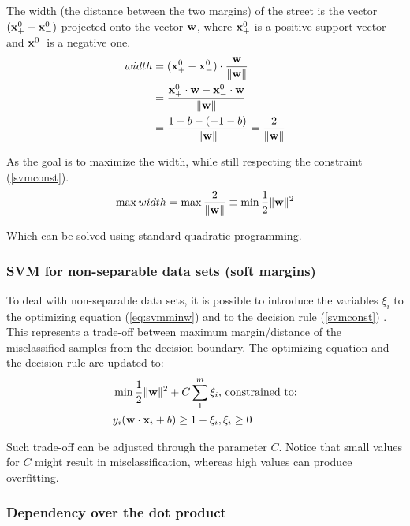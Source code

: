 The width (the distance between the two margins) of the street is the vector $(\mathbf{x}_+^0 - \mathbf{x}_-^0)$ projected onto the vector $\mathbf{w}$, where $\mathbf{x}_+^0$ is a positive support vector and $\mathbf{x}_-^0$ is a negative one.
\begin{equation} \label{eq:eqsvmwidth}
\begin{split}
width &= (\mathbf{x}_+^0 - \mathbf{x}_-^0) \cdot \frac{\mathbf{w}}{\|\mathbf{w}\|} \\
      &=\frac{\mathbf{x}_+^0 \cdot \mathbf{w} - \mathbf{x}_-^0 \cdot \mathbf{w}}{\|\mathbf{w}\|} \\
      &=\frac{1-b - (-1-b)}{\|\mathbf{w}\|} = \frac{2}{\|\mathbf{w}\|}
\end{split}
\end{equation}

As the goal is to maximize the width, while still respecting the constraint (\ref{svmconst}).
\begin{equation} \label{eq:svmminw}
	\max width = \max \frac{2}{\|\mathbf{w}\|} \equiv \min \frac{1}{2} \|\mathbf{w}\|^2
\end{equation}

Which can be solved using standard quadratic programming.

\subsubsection{SVM for non-separable data sets (soft margins)}

To deal with non-separable data sets, it is possible to introduce the variables $\xi_i$ to the optimizing equation (\ref{eq:svmminw}) and to the decision rule (\ref{svmconst}) \cite{wessvmdef}. This represents a trade-off between maximum margin/distance of the misclassified samples from the decision boundary. The optimizing equation and the decision rule are updated to:
\begin{align*}
	&\min \frac{1}{2} \|\mathbf{w}\|^2 + C \sum_{1}^{m}\xi_i \text{, constrained to:} \\
	&y_i(\mathbf{w} \cdot \mathbf{x}_i +b) \geq 1- \xi_i, \xi_i \geq 0
\end{align*}

Such trade-off can be adjusted through the parameter $C$. Notice that small values for $C$ might result in misclassification, whereas high values can produce overfitting.

\subsubsection{Dependency over the dot product}

